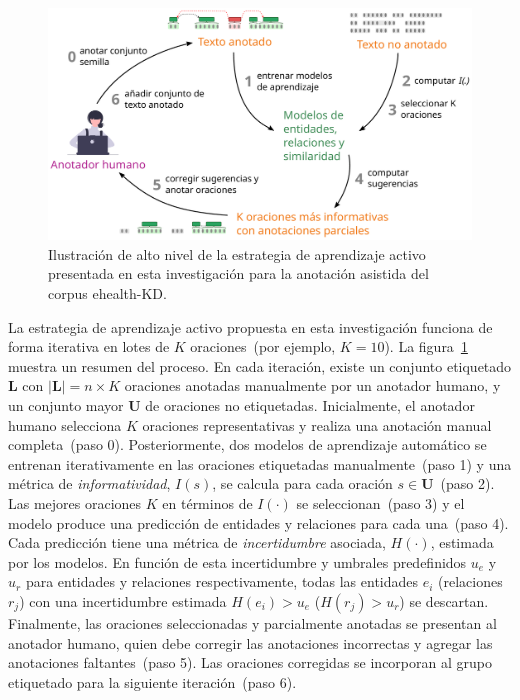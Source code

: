\begin{figure}[htb]
    \centering
    \includegraphics[width=\textwidth]{Images/Chapters/SchemaAssistedAnnotation.pdf}
    \caption[Estrategia de aprendizaje activo.]{Ilustración de alto nivel de la estrategia de aprendizaje activo presentada en esta investigación para la anotación asistida del corpus ehealth-KD.}
    \label{fig:assisted-annotation}
\end{figure}

\newcommand{\Labeled}{\mathbf{L}}
\newcommand{\Unlabeled}{\mathbf{U}}
\newcommand{\infr}[1]{I(#1)}
\newcommand{\infrc}{\infr{\cdot}}
\newcommand{\unc}[1]{H(#1)}
\newcommand{\uncc}{\unc{\cdot}}
\newcommand{\id}[1]{ID(#1)}
\newcommand{\uncm}[1]{\hat{H}(#1)}
\newcommand{\unccm}{\uncm{\cdot}}

La estrategia de aprendizaje activo propuesta en esta investigación funciona de forma iterativa en lotes de $K$ oraciones~(por ejemplo, $K=10$).
La figura~\ref{fig:assisted-annotation} muestra un resumen del proceso.
En cada iteración, existe un conjunto etiquetado $\Labeled$ con $|\Labeled|=n \times K$ oraciones anotadas manualmente por un anotador humano, y un conjunto mayor  $\Unlabeled$ de oraciones no etiquetadas.
Inicialmente, el anotador humano selecciona $K$ oraciones representativas y realiza una anotación manual completa~(paso 0).
Posteriormente, dos modelos de aprendizaje automático se entrenan iterativamente en las oraciones etiquetadas manualmente~(paso 1) y una métrica de \textit{informatividad}, $\infr{s}$, se calcula para cada oración $s \in \Unlabeled$~(paso 2).
Las mejores oraciones $K$ en términos de $\infrc$ se seleccionan~(paso 3) y el modelo produce una predicción de entidades y relaciones para cada una~(paso 4).
Cada predicción tiene una métrica de \textit{incertidumbre} asociada, $\uncc$, estimada por los modelos.
En función de esta incertidumbre y umbrales predefinidos $u_e$ y $u_r$ para entidades y relaciones respectivamente, todas las entidades $e_i$ (relaciones $r_j$) con una incertidumbre estimada $\unc{e_i}>u_e$ ($\unc{r_j}>u_r$) se descartan.
Finalmente, las oraciones seleccionadas y parcialmente anotadas se presentan al anotador humano, quien debe corregir las anotaciones incorrectas y agregar las anotaciones faltantes~(paso 5).
Las oraciones corregidas se incorporan al grupo etiquetado para la siguiente iteración~(paso 6).

